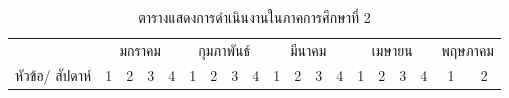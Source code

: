 \documentclass[12pt,oneside,openright,a4paper]{cpe-thai-project}
\begin{document}
\begin{table}[!h]
\caption{ตารางแสดงการดําเนินงานในภาคการศึกษาที่ 2}\label{tbl:table1.2}
\begin{tabular}{|l|cccc|cccc|cccc|cccc|cc|}
\hline
\multicolumn{1}{|c|}{}                                                          & \multicolumn{4}{c|}{มกราคม}                                                                                                                                              & \multicolumn{4}{c|}{กุมภาพันธ์}                                                                                                                                                                 & \multicolumn{4}{c|}{มีนาคม}                                                                                                                                                                                                                                          & \multicolumn{4}{c|}{เมษายน}                                                                                                                                                                                                                                          & \multicolumn{2}{c|}{พฤษภาคม}                                                                                           \\ \cline{2-19} 
\multicolumn{1}{|c|}{\multirow{-2}{*}{หัวข้อ/ สัปดาห์}}                         & \multicolumn{1}{c|}{1}                        & \multicolumn{1}{c|}{2}                        & \multicolumn{1}{c|}{3}                        & 4                        & \multicolumn{1}{c|}{1}                        & \multicolumn{1}{c|}{2}                        & \multicolumn{1}{c|}{3}                        & 4                                               & \multicolumn{1}{c|}{1}                                               & \multicolumn{1}{c|}{2}                                               & \multicolumn{1}{c|}{3}                                               & 4                                               & \multicolumn{1}{c|}{1}                                               & \multicolumn{1}{c|}{2}                                               & \multicolumn{1}{c|}{3}                                               & 4                                               & \multicolumn{1}{c|}{1}                                               & 2                                               \\ \hline

\end{tabular}
\end{table}
\end{document}
